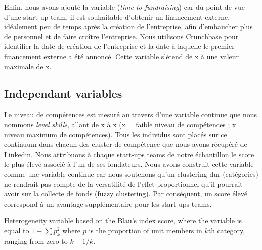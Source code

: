 \documentclass[12pt]{article}
\begin{document}
Enfin, nous avons ajouté la variable (\textit{time to fundraising}) car du point de vue d'une start-up team, il est souhaitable d'obtenir un financement externe, idéalement peu de temps après la création de l'entreprise, afin d'embaucher plus de personnel et de faire croître l'entreprise. Nous utilisons Crunchbase pour identifier la date de création de l'entreprise et la date à laquelle le premier financement externe a été annoncé. Cette variable s'étend de x à une valeur maximale de x.

\subsection{Independant variables}

Le niveau de compétences est mesuré au travers d'une variable continue que nous nommons \textit{level skills}, allant de x à x (x = faible niveau de compétences ; x = niveau maximum de compétences). Tous les individus sont placés sur ce continuum dans chacun des cluster de compétence que nous avons récupéré de Linkedin. Nous attribuons à chaque start-ups teams de notre échantillon le score le plus élevé associé à l'un de ses fondateurs. Nous avons construit cette variable comme une variable continue car nous soutenons qu'un clustering dur (catégories) ne rendrait pas compte de la versatilité de l'effet proportionnel qu'il pourrait avoir sur la collecte de fonds (fuzzy clustering). Par conséquent, un score élevé correspond à un avantage supplémentaire pour les start-ups teams.

Heterogeneity variable based on the Blau's index score, where the variable is equal to $1-\sum p_k^2$ where $p$ is the proportion of unit members in $k$th category, ranging from zero to $k-1/k$.
\end{document}
